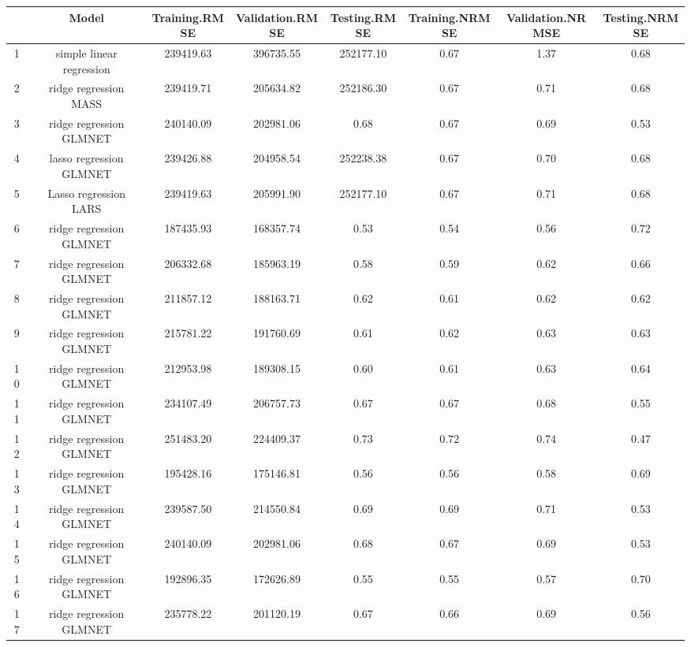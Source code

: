 % 
\begin{tabular}{cccccccc}
  \hline
 & Model & Training.RMSE & Validation.RMSE & Testing.RMSE & Training.NRMSE & Validation.NRMSE & Testing.NRMSE \\ 
  \hline
1 & simple linear regression & 239419.63 & 396735.55 & 252177.10 & 0.67 & 1.37 & 0.68 \\ 
  2 & ridge regression MASS & 239419.71 & 205634.82 & 252186.30 & 0.67 & 0.71 & 0.68 \\ 
  3 & ridge regression GLMNET & 240140.09 & 202981.06 & 0.68 & 0.67 & 0.69 & 0.53 \\ 
  4 & lasso regression GLMNET & 239426.88 & 204958.54 & 252238.38 & 0.67 & 0.70 & 0.68 \\ 
  5 & Lasso regression LARS & 239419.63 & 205991.90 & 252177.10 & 0.67 & 0.71 & 0.68 \\ 
  6 & ridge regression GLMNET & 187435.93 & 168357.74 & 0.53 & 0.54 & 0.56 & 0.72 \\ 
  7 & ridge regression GLMNET & 206332.68 & 185963.19 & 0.58 & 0.59 & 0.62 & 0.66 \\ 
  8 & ridge regression GLMNET & 211857.12 & 188163.71 & 0.62 & 0.61 & 0.62 & 0.62 \\ 
  9 & ridge regression GLMNET & 215781.22 & 191760.69 & 0.61 & 0.62 & 0.63 & 0.63 \\ 
  10 & ridge regression GLMNET & 212953.98 & 189308.15 & 0.60 & 0.61 & 0.63 & 0.64 \\ 
  11 & ridge regression GLMNET & 234107.49 & 206757.73 & 0.67 & 0.67 & 0.68 & 0.55 \\ 
  12 & ridge regression GLMNET & 251483.20 & 224409.37 & 0.73 & 0.72 & 0.74 & 0.47 \\ 
  13 & ridge regression GLMNET & 195428.16 & 175146.81 & 0.56 & 0.56 & 0.58 & 0.69 \\ 
  14 & ridge regression GLMNET & 239587.50 & 214550.84 & 0.69 & 0.69 & 0.71 & 0.53 \\ 
  15 & ridge regression GLMNET & 240140.09 & 202981.06 & 0.68 & 0.67 & 0.69 & 0.53 \\ 
  16 & ridge regression GLMNET & 192896.35 & 172626.89 & 0.55 & 0.55 & 0.57 & 0.70 \\ 
  17 & ridge regression GLMNET & 235778.22 & 201120.19 & 0.67 & 0.66 & 0.69 & 0.56 \\ 
   \hline
\end{tabular}
